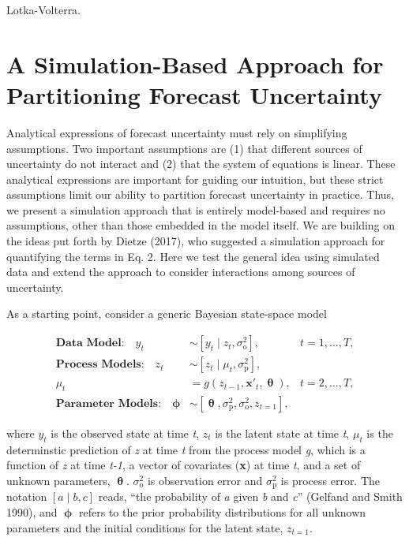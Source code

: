 \documentclass[12pt,]{article}
\begin{document}
Lotka-Volterra.

\hypertarget{a-simulation-based-approach-for-partitioning-forecast-uncertainty}{%
\section{A Simulation-Based Approach for Partitioning Forecast
Uncertainty}\label{a-simulation-based-approach-for-partitioning-forecast-uncertainty}}

Analytical expressions of forecast uncertainty must rely on simplifying
assumptions. Two important assumptions are (1) that different sources of
uncertainty do not interact and (2) that the system of equations is
linear. These analytical expressions are important for guiding our
intuition, but these strict assumptions limit our ability to partition
forecast uncertainty in practice. Thus, we present a simulation approach
that is entirely model-based and requires no assumptions, other than
those embedded in the model itself. We are building on the ideas put
forth by Dietze (2017), who suggested a simulation approach for
quantifying the terms in Eq. 2. Here we test the general idea using
simulated data and extend the approach to consider interactions among
sources of uncertainty.

As a starting point, consider a generic Bayesian state-space model

\begin{align}
\textbf{Data Model:} \quad y_t &\sim \left[y_t \;|\; z_t, \sigma^2_{\text{o}}\right], &t = 1,\dots,T, \\
\textbf{Process Models:} \quad z_t &\sim \left[z_t \;|\; \mu_t, \sigma^2_{\text{p}}\right],  \\
\mu_t &= g \left(z_{t-1},\textbf{x}'_t, \bm{\uptheta} \right), &t = 2,\dots,T, \\
\textbf{Parameter Models:} \quad \bm{\upphi} &\sim \left[\bm{\uptheta},\sigma^2_{\text{p}},\sigma^2_{\text{o}},z_{t=1} \right],
\end{align}

\noindent{}where \(y_t\) is the observed state at time \emph{t}, \(z_t\)
is the latent state at time \emph{t}, \(\mu_t\) is the determinstic
prediction of \emph{z} at time \emph{t} from the process model \emph{g},
which is a function of \emph{z} at time \emph{t-1}, a vector of
covariates (\textbf{x}) at time \emph{t}, and a set of unknown
parameters, \(\bm{\uptheta}\). \(\sigma^2_{\text{o}}\) is observation
error and \(\sigma^2_{\text{p}}\) is process error. The notation
\(\left[a \;|\; b, c\right]\) reads, ``the probability of \emph{a} given
\emph{b} and \emph{c}'' (Gelfand and Smith 1990), and \(\bm{\upphi}\)
refers to the prior probability distributions for all unknown parameters
and the initial conditions for the latent state, \(z_{t=1}\).
\end{document}
